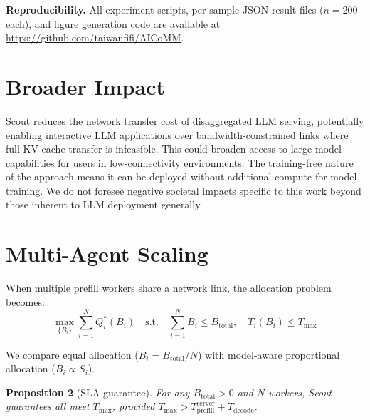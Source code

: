 \documentclass{article}
\begin{document}
\textbf{Reproducibility.}
All experiment scripts, per-sample JSON result files ($n = 200$ each), and figure generation code are available at \url{https://github.com/taiwanfifi/AICoMM}.

\section*{Broader Impact}

Scout reduces the network transfer cost of disaggregated LLM serving, potentially enabling interactive LLM applications over bandwidth-constrained links where full KV-cache transfer is infeasible.
This could broaden access to large model capabilities for users in low-connectivity environments.
The training-free nature of the approach means it can be deployed without additional compute for model training.
We do not foresee negative societal impacts specific to this work beyond those inherent to LLM deployment generally.




\appendix

\section{Multi-Agent Scaling}
\label{app:multiagent}

When multiple prefill workers share a network link, the allocation problem becomes:
\begin{equation}
    \max_{\{B_i\}} \sum_{i=1}^{N} Q_i^*(B_i)
    \quad \text{s.t.} \quad \sum_{i=1}^{N} B_i \leq B_{\text{total}}, \quad T_i(B_i) \leq T_{\max}
\end{equation}

We compare equal allocation ($B_i = B_{\text{total}}/N$) with model-aware proportional allocation ($B_i \propto S_i$).

\textbf{Proposition 2} (SLA guarantee).
\emph{For any $B_{\text{total}} > 0$ and $N$ workers, Scout guarantees all meet $T_{\max}$, provided $T_{\max} > T_{\text{prefill}}^{\text{server}} + T_{\text{decode}}$.}
\end{document}
